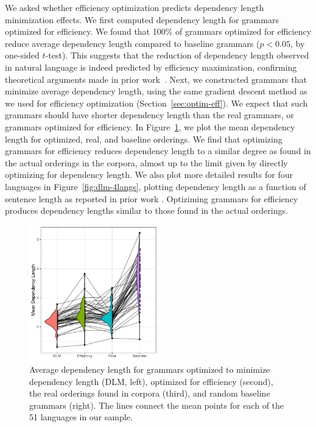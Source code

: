 \documentclass[10pt,twoside,lineno]{article}
\begin{document}
We asked whether efficiency optimization predicts dependency length minimization effects.
We first computed dependency length for grammars optimized for efficiency.
We found that 100\% of grammars optimized for efficiency reduce average dependency length compared to baseline grammars ($p < 0.05$, by one-sided $t$-test). 
This suggests that the reduction of dependency length observed in natural language is indeed predicted by efficiency maximization, confirming theoretical arguments made in prior work~\cite{hawkins1994performance,hawkins2004efficiency,futrell2017memory, futrell2017generalizing}.
Next, we constructed grammars that minimize average dependency length, using the same gradient descent method as we used for efficiency optimization (Section~\ref{sec:optim-eff}).
We expect that such grammars should have shorter dependency length than the real grammars, or grammars optimized for efficiency.
In Figure~\ref{fig:dlm-avg}, we plot the mean dependency length for optimized, real, and baseline orderings.
We find that optimizing grammars for efficiency reduces dependency length to a similar degree as found in the actual orderings in the corpora, almost up to the limit given by directly optimizing for dependency length.
We also plot more detailed results for four languages in Figure~\ref{fig:dlm-4langs}, plotting dependency length as a function of sentence length as reported in prior work \cite{futrell2015largescale}.
Optiziming grammars for efficiency produces dependency lengths similar to those found in the actual orderings.

\begin{figure}[ht]
    \centering
     \includegraphics[width=0.5\textwidth]{depl-violin-all-1.png} %
        \caption{Average dependency length for grammars optimized to minimize dependency length (DLM, left), optimized for efficiency (second), the real orderings found in corpora (third), and random baseline grammars (right). The lines connect the mean points for each of the 51 languages in our sample.}
    \label{fig:dlm-avg}
\end{figure}
\end{document}
